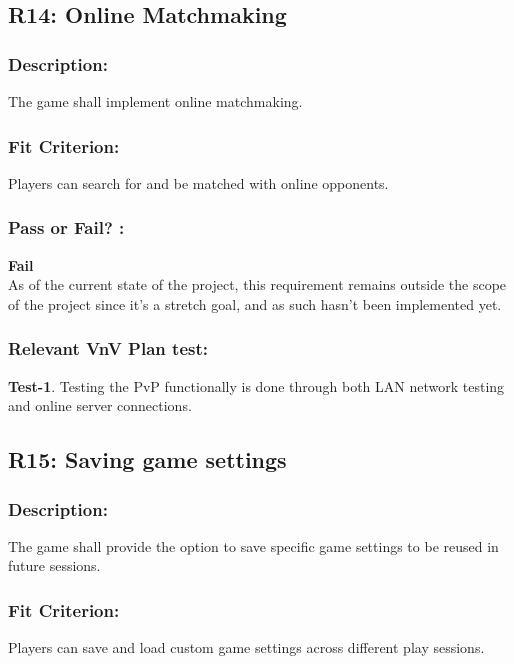 \documentclass[12pt, titlepage]{article}
\begin{document}
\subsection{R14: Online Matchmaking} 
\label{R14} 

\subsubsection*{Description:}The game shall implement online matchmaking.

\subsubsection*{Fit Criterion:}Players can search for and be matched with online opponents.

\subsubsection*{Pass or Fail? :} 

 \noindent \textbf{Fail}\\
 
 \noindent As of the current state of the project, this requirement remains outside the scope of the project since it's a stretch goal, and as such hasn't been implemented yet. 

\subsubsection*{Relevant VnV Plan test: } \textbf{Test-1}. Testing the PvP functionally is done through both LAN network testing and online server connections.


\subsection{R15: Saving game settings} 
\label{R15} 

\subsubsection*{Description:}The game shall provide the option to save specific game settings to be reused in future sessions.

\subsubsection*{Fit Criterion:}Players can save and load custom game settings across different play sessions.
\end{document}
